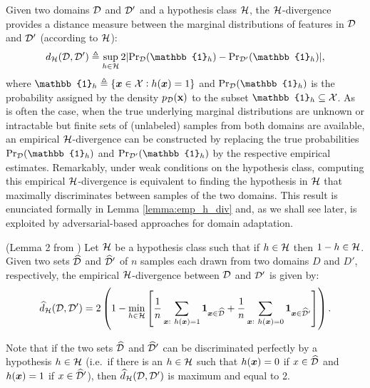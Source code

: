 Given two domains ${\mathcal{D}}$ and ${\mathcal{D}}'$ and a hypothesis class ${\mathcal{H}}$, the ${\mathcal{H}}$-divergence provides a distance measure between the marginal distributions of features in ${\mathcal{D}}$ and ${\mathcal{D}}'$ (according to ${\mathcal{H}}$):
\begin{equation}
    \label{eq:h_div}
    d_{\gH}(\gD,\gD') \triangleq \sup_{h \in \gH} 2 |\mathrm{Pr}_{\gD}(\mathbb{1}_h) - \mathrm{Pr}_{\gD'}(\mathbb{1}_h)|,
\end{equation}
where $\mathbb{1}_h \triangleq \{\vx \in \gX: h(\vx)=1\}$ and $\mathrm{Pr}_{\gD}(\mathbb{1}_h)$ is the probability assigned by the density $p_{\mathcal{D}}({\mathbf{x}})$ to the subset $\mathbb{1}_h \subseteq \gX$. As is often the case, when the true underlying marginal distributions are unknown or intractable but finite sets of (unlabeled) samples from both domains are available, an empirical ${\mathcal{H}}$-divergence can be constructed by replacing the true probabilities $\mathrm{Pr}_{\gD}(\mathbb{1}_h)$ and $\mathrm{Pr}_{\gD'}(\mathbb{1}_h)$ by the respective empirical estimates. Remarkably, under weak conditions on the hypothesis class, computing this empirical ${\mathcal{H}}$-divergence is equivalent to finding the hypothesis in ${\mathcal{H}}$ that maximally discriminates between samples of the two domains. This result is enunciated formally in Lemma \ref{lemma:emp_h_div} and, as we shall see later, is exploited by adversarial-based approaches for domain adaptation.
\begin{lemma}
    \label{lemma:emp_h_div}
    (Lemma 2 from \citet{BenDavid2010}) Let ${\mathcal{H}}$ be a hypothesis class such that if $h \in {\mathcal{H}}$ then $1-h \in {\mathcal{H}}$. Given two sets $\widehat{{\mathcal{D}}}$ and $\widehat{{\mathcal{D}}}'$ of $n$ samples each drawn from two domains $D$ and $D'$, respectively, the empirical ${\mathcal{H}}$-divergence between ${\mathcal{D}}$ and ${\mathcal{D}}'$ is given by:
    \begin{equation}
        \widehat{d}_{{\mathcal{H}}}({\mathcal{D}},{\mathcal{D}}') = 2 \left(1 - \min_{h \in {\mathcal{H}}} \left[\frac{1}{n} \sum_{{\bm{x}}:~h({\bm{x}})=1} \bm{1}_{{\bm{x}} \in \widehat{{\mathcal{D}}}} + \frac{1}{n} \sum_{{\bm{x}}:~h({\bm{x}})=0} \bm{1}_{{\bm{x}} \in \widehat{{\mathcal{D}}}'}\right]\right).
    \end{equation}
\end{lemma}
Note that if the two sets $\widehat{{\mathcal{D}}}$ and $\widehat{{\mathcal{D}}}'$ can be discriminated perfectly by a hypothesis $h \in {\mathcal{H}}$ (i.e.\ if there is an $h \in {\mathcal{H}}$ such that $h({\bm{x}}) = 0$ if $x \in \widehat{{\mathcal{D}}}$ and $h({\bm{x}}) = 1$ if $x \in \widehat{{\mathcal{D}}}'$), then $\widehat{d}_{{\mathcal{H}}}({\mathcal{D}},{\mathcal{D}}')$ is maximum and equal to 2.

